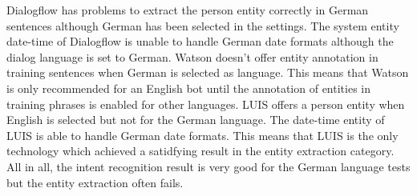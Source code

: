 Dialogflow has problems to extract the person entity correctly in German sentences although German 
has been selected in the settings. 
The system entity date-time of Dialogflow is unable to handle German date formats although 
the dialog language is set to German.
Watson doesn't offer entity annotation in training sentences when German is selected as language.
This means that Watson is only recommended for an English bot until the annotation of entities in 
training phrases is enabled for other languages.
LUIS offers a person entity when English is selected but not for the German language.
The date-time entity of LUIS is able to handle German date formats. 
This means that LUIS is the only technology which achieved a satidfying result in the entity extraction category.
All in all, the intent recognition result is very good for the German language tests but the entity extraction 
often fails.






